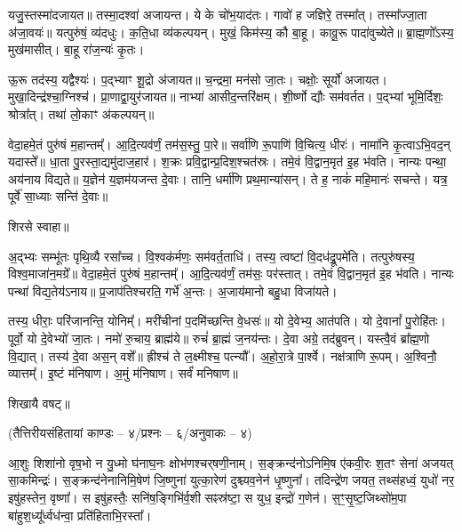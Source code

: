  यजु॒स्तस्मा॑दजायत॥ तस्मा॒दश्वा॑ अजायन्त। ये के चो॑भ॒याद॑तः। गावो॑ ह जज्ञिरे॒ तस्मा᳚त्। तस्मा᳚ज्जा॒ता अ॑जा॒वयः॑॥ यत्पुरु॑षं॒ व्य॑दधुः। क॒ति॒धा व्य॑कल्पयन्। मुखं॒ किम॑स्य॒ कौ बा॒हू। कावू॒रू पादा॑वुच्येते॥ ब्रा॒ह्म॒णो᳚ऽस्य॒ मुख॑मासीत्। बा॒हू रा॑ज॒न्यः॑ कृ॒तः।

 ऊ॒रू तद॑स्य॒ यद्वैश्यः॑। प॒द्भ्याꣳ शू॒द्रो अ॑जायत॥ च॒न्द्रमा॒ मन॑सो जा॒तः। चक्षोः॒ सूर्यो॑ अजायत। मुखा॒दिन्द्र॑श्चा॒ग्निश्च॑। प्रा॒णाद्वा॒युर॑जायत॥ नाभ्या॑ आसीद॒न्तरि॑क्षम्। शी॒र्ष्णो द्यौः सम॑वर्तत। प॒द्भ्यां भूमि॒र्दिशः॒ श्रोत्रा᳚त्। तथा॑ लो॒काꣳ अ॑कल्पयन्॥

 वेदा॒हमे॒तं पुरु॑षं म॒हान्तम्᳚। आ॒दि॒त्यव॑र्णं॒ तम॑स॒स्तु॒ पा॒रे॥ सर्वा॑णि रू॒पाणि॑ वि॒चित्य॒ धीरः॑। नामा॑नि कृ॒त्वाऽभि॒वद॒न् यदास्ते᳚॥ धा॒ता पु॒रस्ता॒द्यमु॑दाज॒हार॑। श॒क्रः प्रवि॒द्वान्प्र॒दिश॒श्चत॑स्रः। तमे॒वं वि॒द्वान॒मृत॑ इ॒ह भ॑वति। नान्यः पन्था॒ अय॑नाय विद्यते॥ य॒ज्ञेन॑ य॒ज्ञम॑यजन्त दे॒वाः। तानि॒ धर्मा॑णि प्रथ॒मान्या॑सन्। ते ह॒ नाकं॑ महि॒मानः॑ सचन्ते। यत्र॒ पूर्वे॑ सा॒ध्याः सन्ति॑ दे॒वाः॥ 

शिरसे स्वाहा॥

{\small \closesection}


अ॒द्भ्यः सम्भू॑तः पृथि॒व्यै रसा᳚च्च। वि॒श्वक॑र्मणः॒ सम॑वर्त॒ताधि॑। तस्य॒ त्वष्टा॑ वि॒दध॑द्रू॒पमे॑ति। तत्पुरु॑षस्य॒ विश्व॒माजा॑न॒मग्रे᳚॥ वेदा॒हमे॒तं पुरु॑षं म॒हान्तम्᳚। आ॒दि॒त्यव॑र्णं॒ तम॑सः॒ पर॑स्तात्। तमे॒वं वि॒द्वान॒मृत॑ इ॒ह भ॑वति। नान्यः पन्था॑ विद्य॒तेय॑ऽनाय॥ प्र॒जाप॑तिश्चरति॒ गर्भे॑ अ॒न्तः। अ॒जाय॑मानो बहु॒धा विजा॑यते। 

तस्य॒ धीराः॒ परि॑जानन्ति॒ योनिम्᳚। मरी॑चीनां प॒दमि॑च्छन्ति वे॒धसः॑॥ यो दे॒वेभ्य॒ आत॑पति। यो दे॒वानां᳚ पु॒रोहि॑तः। पूर्वो॒ यो दे॒वेभ्यो॑ जा॒तः। नमो॑ रु॒चाय॒ ब्राह्म॑ये॥ रुचं॑ ब्रा॒ह्मं ज॒नय॑न्तः। दे॒वा अग्रे॒ तद॑ब्रुवन्। यस्त्वै॒वं ब्रा᳚ह्म॒णो वि॒द्यात्। तस्य॑ दे॒वा अस॒न् वशे᳚॥ ह्रीश्च॑ ते ल॒क्ष्मीश्च॒ पत्न्यौ᳚। अ॒हो॒रा॒त्रे पा॒र्श्वे। नक्ष॑त्राणि रू॒पम्। अ॒श्विनौ॒ व्यात्तम्᳚। इ॒ष्टं म॑निषाण। अ॒मुं म॑निषाण। सर्वं॑ मनिषाण॥ 

शिखायै वषट्॥

{\small \closesection}

\centerline{\normalsize (तैत्तिरीयसंहितायां काण्डः – ४/प्रश्नः – ६/अनुवाकः – ४)}

आ॒शुः शिशा॑नो वृष॒भो न यु॒ध्मो घ॑नाघ॒नः क्षोभ॑णश्चर्‌षणी॒नाम्। स॒ङ्क्रन्द॑नो\-ऽनिमि॒ष ए॑कवी॒रः श॒तꣳ सेना॑ अजयत् सा॒कमिन्द्रः॑। स॒ङ्क्रन्द॑नेना\-निमि॒षेण॑ जि॒ष्णुना॑ युत्का॒रेण॑ दुश्च्यव॒नेन॑ धृ॒ष्णुना᳚। तदिन्द्रे॑ण जयत॒ तथ्स॑हध्वं॒ युधो॑ नर॒ इषु॑हस्तेन॒ वृष्णा᳚। स इषु॑हस्तैः॒ सनि॑ष॒ङ्गिभि॑र्व॒शी सꣴस्र॑ष्टा॒ स युध॒ इन्द्रो॑ ग॒णेन॑। स॒ꣳ॒सृ॒ष्ट॒जिथ्सो॑म॒पा बा॑हुश॒ध्यू᳚र्ध्वध॑न्वा॒ प्रति॑हिताभि॒रस्ता᳚।

